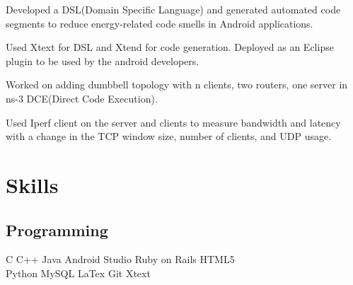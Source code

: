 \documentclass[]{deedy-resume-openfont}
\begin{document}
\begin{minipage}[t]{0.66\textwidth}
\begin{tightemize}
\item Developed a DSL(Domain Specific Language) and generated automated code segments to reduce energy-related code smells in Android applications.\item Used Xtext for DSL and Xtend for code generation. Deployed as an Eclipse plugin to be used by the android developers.
\end{tightemize}
\sectionsep

\begin{tightemize}
\item Worked on adding dumbbell topology with n clients, two routers, one server in ns-3 DCE(Direct Code Execution).\item Used Iperf client on the server and clients to measure bandwidth and latency with a change in the TCP window size, number of clients, and UDP usage.   
\end{tightemize}
\sectionsep



\section{Skills}
\subsection{Programming}
C \textbullet{}   C++ \textbullet{} Java    \textbullet{} Android Studio  \textbullet{} Ruby on Rails \textbullet{ }HTML5\\
Python \textbullet{} MySQL \textbullet{}  LaTex\textbullet{} Git \textbullet{} Xtext
\sectionsep


\end{minipage} 
\end{document}
